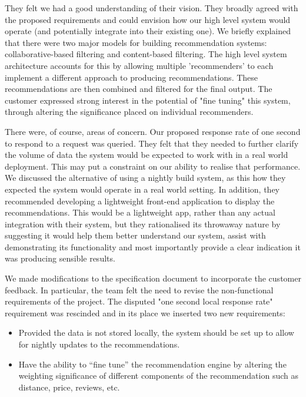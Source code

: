 \documentclass{l3proj}
\begin{document}
They felt we had a good understanding of their vision. They broadly agreed with the proposed requirements and could envision how our high level system would operate (and potentially integrate into their existing one). We briefly explained that there were two major models for building recommendation systems: collaborative-based filtering and content-based filtering. The high level system architecture accounts for this by allowing multiple 'recommenders' to each implement a different approach to producing recommendations. These recommendations are then combined and filtered for the final output. The customer expressed strong interest in the potential of "fine tuning" this system, through altering the significance placed on individual recommenders. 


There were, of course, areas of concern. Our proposed response rate of one second to respond to a request was queried. They felt that they needed to further clarify the volume of data the system would be expected to work with in a real world deployment. This may put a constraint on our ability to realise that performance. We discussed the alternative of using a nightly build system, as this how they expected the system would operate in a real world setting. In addition, they recommended developing a lightweight front-end application to display the recommendations. This would be a lightweight app, rather than any actual integration with their system, but they rationalised its throwaway nature by suggesting it would help them better understand our system, assist with demonstrating its functionality and most importantly provide a clear indication it was producing sensible results. 

We made modifications to the specification document to incorporate the customer feedback. In particular, the team felt the need to revise the non-functional requirements of the project. The disputed "one second local response rate" requirement was rescinded and in its place we inserted two new requirements:

\begin{itemize}
\item Provided the data is not stored locally, the system should be set up to allow for nightly updates to the recommendations.
\item Have the ability to “fine tune” the recommendation engine by altering the weighting significance of different components of the recommendation such as distance, price, 
reviews, etc.
\end{itemize}
\end{document}
